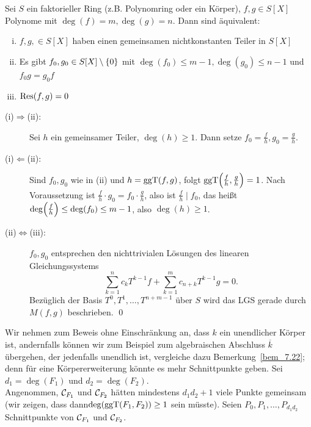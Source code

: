 \begin{satz}
\label{satz_10.8}
	Sei $S$ ein faktorieller Ring (z.B. Polynomring oder ein Körper), $f,g \in S[X]$ Polynome mit $\deg(f)=m, \deg(g)=n$. 
	Dann sind äquivalent: 
	\begin{enumerate}[(i)]
		\item $f,g, \in S[X]$ haben einen gemeinsamen nichtkonstanten Teiler in $S[X]$
		\item Es gibt $f_0,g_0 \in S[X] \setminus \{0\}$ mit $\deg(f_0) \leq m-1, \deg(g_0) \leq n-1$ und $f_0 g= g_0 f$
		\item $\operatorname{Res}(f,g) = 0$
	\end{enumerate}
\end{satz}

	\begin{description}
		\item[(i)$\Rightarrow$(ii):] Sei $h$ ein gemeinsamer Teiler, $\deg(h) \geq 1$. 
		Dann setze $f_0 = \frac{f}{h}, g_0 = \frac{g}{h}$.
		\item[(i)$\Leftarrow$(ii):] Sind $f_0,g_0$ wie in (ii) und $h = \operatorname{ggT}(f,g)$, folgt $\ggT\enbrace*{\frac{f}{h},\frac{g}{h}}=1$. 
		Nach Voraussetzung ist $\frac{f}{h} \cdot g_0 = f_0 \cdot \frac{g}{h}$, also ist $\frac{f}{h} \mid f_0$, das heißt $\deg\enbrace*{\frac{f}{h}} \leq \deg(f_0) \leq m-1$, also $\deg(h) \geq 1$.
		\item[(ii)$\Leftrightarrow$(iii):] $f_0, g_0$ entsprechen den nichttrivialen Lösungen des linearen Gleichungssystems
		\[ \sum_{k=1}^{n} c_k T^{k-1} f + \sum_{k=1}^m c_{n+k} T^{k-1} g = 0. \]
		Bezüglich der Basis $T^0, T^1, \dots, T^{n+m-1}$ über $S$ wird das LGS gerade durch $M(f,g)$ beschrieben. \qed
	\end{description}
	
\begin{bew}
	Wir nehmen zum Beweis ohne Einschränkung an, dass $k$ ein unendlicher Körper ist, andernfalls können wir zum Beispiel zum algebraischen Abschluss $\overline{k}$ übergehen, der jedenfalls unendlich ist, vergleiche dazu Bemerkung~\ref{bem_7.22}; denn für eine Körpererweiterung könnte es mehr Schnittpunkte geben. 
	Sei $d_1 = \deg(F_1)$ und $d_2 = \deg(F_2)$. \\
	Angenommen, $\mathcal{C}_{F_1}$ und $\mathcal{C}_{F_2}$ hätten mindestens $d_1 d_2+1$ viele Punkte gemeinsam (wir zeigen, dass dann\linebreak $\deg(\operatorname{ggT}(F_1,F_2)) \geq 1$ sein müsste). 
	Seien $P_0, P_1, \dots, P_{d_1d_2}$ Schnittpunkte von $\mathcal{C}_{F_1}$ und $\mathcal{C}_{F_2}$.
\end{bew}

